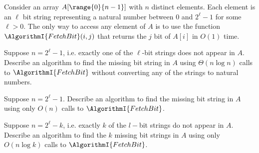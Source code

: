 \begin{questions}[start=13]
{       Consider an array $A[\range{0}{n-1}]$ with $n$ distinct
       elements. Each element is an $\ell$ bit string representing a
       natural number between $0$ and $2^\ell -1$ for some $\ell
       >0$. The only way to access any element of $A$ is to use the
       function $\AlgorithmI{FetchBit}(i,j)$ that returns the $j$\th
       bit of $A[i]$ in $O(1)$ time.
       \begin{questions}
           \item {} Suppose $n=2^\ell-1$, i.e. exactly one of
           the $\ell$-bit strings does not appear in $A$. Describe an
           algorithm to find the missing bit string in $A$ using
           $\Theta(n\log n)$ calls to $\AlgorithmI{FetchBit}$ without
           converting any of the strings to natural numbers.
           
           \item {} Suppose $n=2^\ell-1$. Describe an
           algorithm to find the missing bit string in $A$ using only
           $O(n)$ calls to $\AlgorithmI{FetchBit}$.
           
           \item {} Suppose $n=2^\ell-k$, i.e. exactly $k$ of
           the $l-$bit strings do not appear in $A$.  Describe an
           algorithm to find the $k$ missing bit strings in $A$ using
           only $O(n\log k)$ calls to $\AlgorithmI{FetchBit}$.
           
       \end{questions}
    }{}{}{}{}%
    \medskip%
    
    \item {}
\end{questions}
